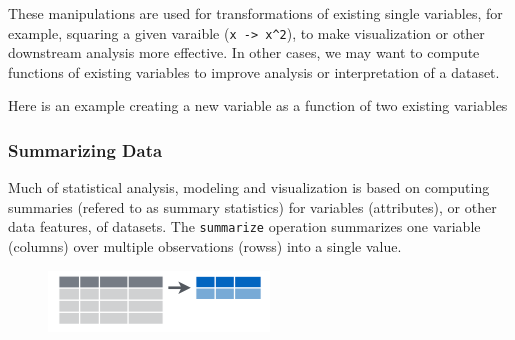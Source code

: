 \documentclass[]{article}
\newenvironment{Shaded}{\begin{snugshade}}{\end{snugshade}}
\newcommand{\KeywordTok}[1]{\textcolor[rgb]{0.13,0.29,0.53}{\textbf{{#1}}}}
\newcommand{\DataTypeTok}[1]{\textcolor[rgb]{0.13,0.29,0.53}{{#1}}}
\newcommand{\StringTok}[1]{\textcolor[rgb]{0.31,0.60,0.02}{{#1}}}
\newcommand{\CommentTok}[1]{\textcolor[rgb]{0.56,0.35,0.01}{\textit{{#1}}}}
\newcommand{\OtherTok}[1]{\textcolor[rgb]{0.56,0.35,0.01}{{#1}}}
\newcommand{\NormalTok}[1]{{#1}}
\theoremstyle{definition}
\theoremstyle{definition}
\theoremstyle{remark}
\begin{document}
These manipulations are used for transformations of existing single
variables, for example, squaring a given varaible
(\texttt{x\ -\textgreater{}\ x\^{}2}), to make visualization or other
downstream analysis more effective. In other cases, we may want to
compute functions of existing variables to improve analysis or
interpretation of a dataset.

Here is an example creating a new variable as a function of two existing
variables

\begin{Shaded}
\end{Shaded}

\subsubsection{Summarizing Data}\label{summarizing-data}

Much of statistical analysis, modeling and visualization is based on
computing summaries (refered to as summary statistics) for variables
(attributes), or other data features, of datasets. The
\texttt{summarize} operation summarizes one variable (columns) over
multiple observations (rowss) into a single value.

\begin{figure}[htbp]
\centering
\includegraphics{img/summarize.png}
\caption{}
\end{figure}

\begin{Shaded}
\end{Shaded}
\end{document}
